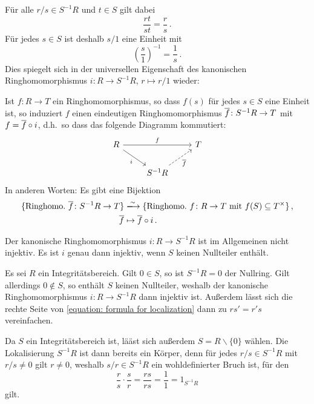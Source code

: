 Für alle $r/s \in S^{-1} R$ und $t \in S$ gilt dabei
\[
    \frac{rt}{st}
  = \frac{r}{s} \,.
\]
Für jedes $s \in S$ ist deshalb $s/1$ eine Einheit mit
\[
    \left( \frac{s}{1} \right)^{-1}
  = \frac{1}{s} \,.
\]
Dies spiegelt sich in der universellen Eigenschaft des kanonischen Ringhomomorphismus $i \colon R \to S^{-1} R$, $r \mapsto r/1$ wieder:

\begin{theorem}
  Ist $f \colon R \to T$ ein Ringhomomorphismus, so dass $f(s)$ für jedes $s \in S$ eine Einheit ist, so induziert $f$ einen eindeutigen Ringhomomorphismus $\overline{f} \colon S^{-1} R \to T$ mit $f = \overline{f} \circ i$, d.h.\ so dass das folgende Diagramm kommutiert:
  \[
    \begin{tikzcd}
        R
        \arrow{rr}[above]{f}
        \arrow{dr}[below left]{i}
      & {}
      & T
      \\
        {}
      & S^{-1} R
        \arrow[dashed]{ur}[below right]{\induced{f}}
      & {}
    \end{tikzcd}
  \]
  In anderen Worten:
  Es gibt eine Bijektion
  \begin{align*}
                            \{ \text{Ringhomo.\ $\induced{f} \colon S^{-1} R \to T$} \}
    &\xlongrightarrow{\sim} \{ \text{Ringhomo.\ $f \colon R \to T$ mit $f(S) \subseteq \unitgroup{T}$} \} \,,  \\
                            \induced{f}
    &\mapsto                \induced{f} \circ i \,.
  \end{align*}
\end{theorem}

\begin{warning}
  Der kanonische Ringhomomorphismus $i \colon R \to S^{-1} R$ ist im Allgemeinen nicht injektiv.
  Es ist $i$ genau dann injektiv, wenn $S$ keinen Nullteiler enthält.
\end{warning}

Es sei $R$ ein Integritätsbereich.
Gilt $0 \in S$, so ist $S^{-1} R = 0$ der Nullring.
Gilt allerdings $0 \notin S$, so enthält $S$ keinen Nullteiler, weshalb der kanonische Ringhomomorphismus $i \colon R \to S^{-1} R$ dann injektiv ist.
Außerdem lässt sich die rechte Seite von \eqref{equation: formula for localization} dann zu $rs' = r's$ vereinfachen.

Da $S$ ein Integritätsbereich ist, lääst sich außerdem $S = R \smallsetminus \{0\}$ wählen.
Die Lokalisierung $S^{-1} R$ ist dann bereits ein Körper, denn für jedes $r/s \in S^{-1} R$ mit $r/s \neq 0$ gilt $r \neq 0$, weshalb $s/r \in S^{-1} R$ ein wohldefinierter Bruch ist, für den
\[
        \frac{r}{s}
  \cdot \frac{s}{r}
  =     \frac{rs}{rs}
  =     \frac{1}{1}
  =     1_{S^{-1} R}
\]
gilt.

